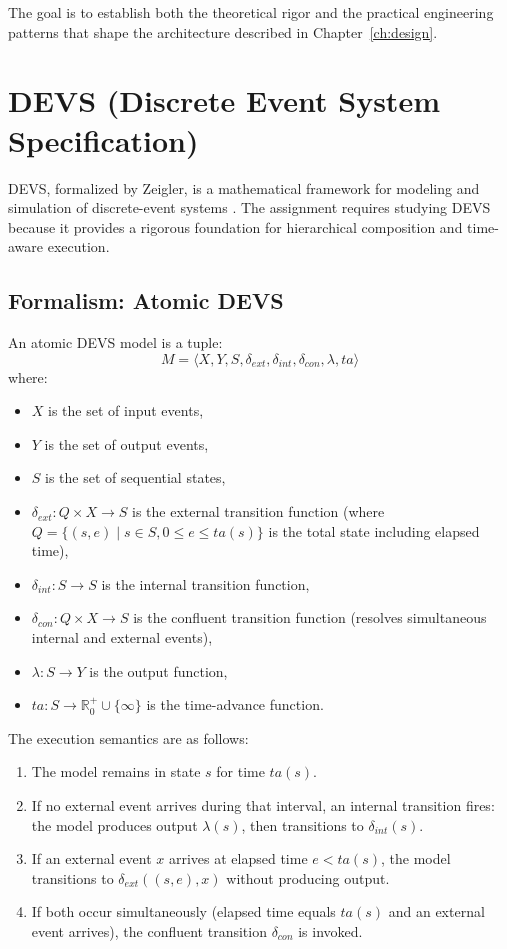 The goal is to establish both the theoretical rigor and the practical engineering patterns that shape the architecture described in Chapter~\ref{ch:design}.

\section{DEVS (Discrete Event System Specification)}

DEVS, formalized by Zeigler, is a mathematical framework for modeling and simulation of discrete-event systems \cite{ZeiglerDEVS}.
The assignment requires studying DEVS because it provides a rigorous foundation for hierarchical composition and time-aware execution.

\subsection{Formalism: Atomic DEVS}

An atomic DEVS model is a tuple:
\[
M = \langle X, Y, S, \delta_{ext}, \delta_{int}, \delta_{con}, \lambda, ta \rangle
\]
where:
\begin{itemize}
  \item $X$ is the set of input events,
  \item $Y$ is the set of output events,
  \item $S$ is the set of sequential states,
  \item $\delta_{ext}: Q \times X \rightarrow S$ is the external transition function (where $Q = \{(s,e) \mid s \in S, 0 \le e \le ta(s)\}$ is the total state including elapsed time),
  \item $\delta_{int}: S \rightarrow S$ is the internal transition function,
  \item $\delta_{con}: Q \times X \rightarrow S$ is the confluent transition function (resolves simultaneous internal and external events),
  \item $\lambda: S \rightarrow Y$ is the output function,
  \item $ta: S \rightarrow \mathbb{R}^+_0 \cup \{\infty\}$ is the time-advance function.
\end{itemize}


The execution semantics are as follows:
\begin{enumerate}
  \item The model remains in state $s$ for time $ta(s)$.
  \item If no external event arrives during that interval, an internal transition fires: the model produces output $\lambda(s)$, then transitions to $\delta_{int}(s)$.
  \item If an external event $x$ arrives at elapsed time $e < ta(s)$, the model transitions to $\delta_{ext}((s,e), x)$ without producing output.
  \item If both occur simultaneously (elapsed time equals $ta(s)$ and an external event arrives), the confluent transition $\delta_{con}$ is invoked.
\end{enumerate}

